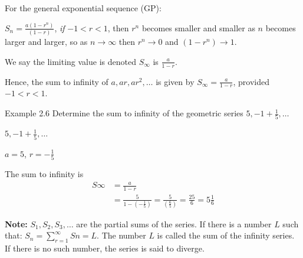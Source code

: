 For the general exponential sequence (GP):

$S_n = \frac{a(1 - r^n)}{(1 - r)}$, \textit{if} $-1 < r < 1$, then $r^n$ becomes smaller and
smaller as $n$ becomes larger and larger, so as $n \longrightarrow \infty$ then $r^n \to 0$
and $(1 - r^n) \to 1$.

We say the limiting value is denoted $S_\infty$ is $\frac{a}{1 - r}$.

Hence, the sum to infinity of $a, ar, ar^2, \ldots$ is given by $S_\infty = \frac{a}{1 - r}$,
provided $-1 < r < 1$.

\begin{example}{Example 2.6}
Determine the sum to infinity of the geometric series $5, -1 + \frac{1}{5}, \ldots$

\solution
$5, -1 + \frac{1}{5}, \ldots$

$a = 5$, $r = -\frac{1}{5}$

The sum to infinity is
\begin{align*}
  S\infty &= \frac{a}{1 - r} \\
  &= \frac{5}{1 - \left(-\frac{1}{5}\right)} = \frac{5}{\left(\frac{6}{5}\right)}
     = \frac{25}{6} = 5\frac{1}{6}
\end{align*}
\end{example}

\noindent\textbf{Note:} $S_1, S_2, S_3, \ldots$ are the partial sums of the series. If there is
a number $L$ such that: $S_n = \sum_{r=1}^{\infty} Sn = L$. The number $L$ is called the
sum of the infinity series. If there is no such number, the series is said to diverge.
